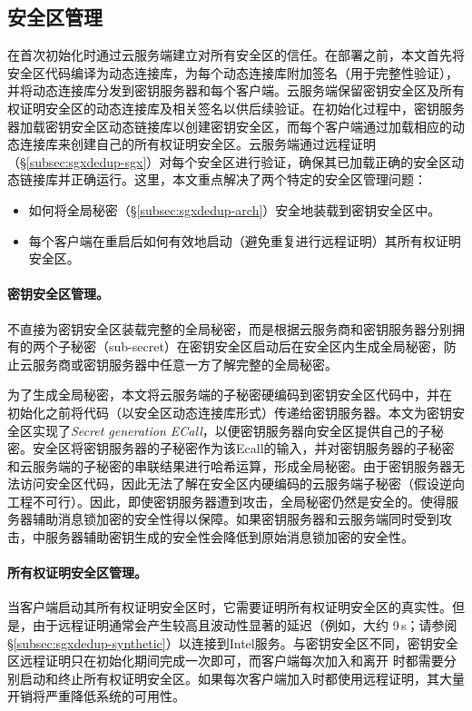 \subsection{安全区管理}
\label{subsec:sgxdedup-enclave-management}

\sysnameS 在首次初始化时通过云服务端建立对所有安全区的信任。在\sysnameS 部署之前，本文首先将安全区代码编译为动态连接库\cite{sgx}，为每个动态连接库附加签名（用于完整性验证），并将动态连接库分发到密钥服务器和每个客户端。云服务端保留密钥安全区及所有权证明安全区的动态连接库及相关签名以供后续验证。在初始化过程中，密钥服务器加载密钥安全区动态链接库以创建密钥安全区，而每个客户端通过加载相应的动态连接库来创建自己的所有权证明安全区。云服务端通过远程证明（\S\ref{subsec:sgxdedup-sgx}）对每个安全区进行验证，确保其已加载正确的安全区动态链接库并正确运行。这里，本文重点解决了两个特定的安全区管理问题：

\begin{itemize}
    \item 如何将全局秘密（\S\ref{subsec:sgxdedup-arch}）安全地装载到密钥安全区中。
    \item 每个客户端在重启后如何有效地启动（避免重复进行远程证明）其所有权证明安全区。
\end{itemize}

\paragraph*{密钥安全区管理。}\sysnameS 不直接为密钥安全区装载完整的全局秘密，而是根据云服务商和密钥服务器分别拥有的两个子秘密（sub-secret）在密钥安全区启动后在安全区内生成全局秘密，防止云服务商或密钥服务器中任意一方了解完整的全局秘密。

为了生成全局秘密，本文将云服务端的子秘密硬编码到密钥安全区代码中，并在 \sysnameS 初始化之前将代码（以安全区动态连接库形式）传递给密钥服务器。本文为密钥安全区实现了\textit{Secret generation ECall}，以便密钥服务器向安全区提供自己的子秘密。安全区将密钥服务器的子秘密作为该Ecall的输入，并对密钥服务器的子秘密和云服务端的子秘密的串联结果进行哈希运算，形成全局秘密。由于密钥服务器无法访问安全区代码，因此无法了解在安全区内硬编码的云服务端子秘密（假设逆向工程不可行）。因此，即使密钥服务器遭到攻击，全局秘密仍然是安全的。使得服务器辅助消息锁加密的安全性得以保障。如果密钥服务器和云服务端同时受到攻击，\sysnameS 中服务器辅助密钥生成的安全性会降低到原始消息锁加密的安全性。

\paragraph*{所有权证明安全区管理。} 当客户端启动其所有权证明安全区时，它​​需要证明所有权证明安全区的真实性。但是，由于远程证明通常会产生较高且波动性显著的延迟（例如，大约 9\,s；请参阅 \S\ref{subsec:sgxdedup-synthetic}）以连接到Intel服务。与密钥安全区不同，密钥安全区远程证明只在初始化期间完成一次即可，而客户端每次加入和离开 \sysnameS 时都需要分别启动和终止所有权证明安全区。如果每次客户端加入时都使用远程证明，其大量开销将严重降低\sysnameS 系统的可用性。

